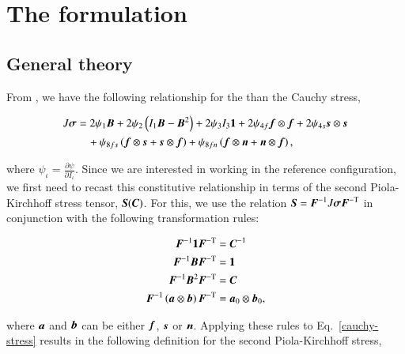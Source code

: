 \section{The formulation}
\label{formulation}

\subsection{General theory}
\label{general-theory}

From \citep{Holzapfel:2009bb}, we have the following relationship for
the than the Cauchy stress,

\begin{equation}
  \begin{split}
    J\mbox{\boldmath$\sigma$} &=   2 \psi_{1} \mbox{\boldmath$ B$}
                + 2 \psi_{2} \left(I_{1} \mbox{\boldmath$ B$} - \mbox{\boldmath$ B$}^{2}\right)
                + 2 \psi_{3} I_{3} {\bf 1}
                + 2 \psi_{4f} \mbox{\boldmath$ f$}\otimes\mbox{\boldmath$ f$}
                + 2 \psi_{4s} \mbox{\boldmath$ s$}\otimes\mbox{\boldmath$ s$}\\
        &\quad  + \psi_{8fs} \left( \mbox{\boldmath$ f$}\otimes\mbox{\boldmath$ s$} + \mbox{\boldmath$ s$}\otimes\mbox{\boldmath$ f$} \right)
                + \psi_{8fn} \left( \mbox{\boldmath$ f$}\otimes\mbox{\boldmath$ n$} + \mbox{\boldmath$ n$}\otimes\mbox{\boldmath$ f$} \right),
  \end{split}
  \label{cauchy-stress}
\end{equation}

\noindent where $\psi_{\iota} = \frac{\partial \psi}{\partial
  I_{\iota}}$. Since we are interested in working in the reference
configuration, we first need to recast this constitutive relationship
in terms of the second Piola-Kirchhoff stress tensor, $\mbox{\boldmath$ S$}(\mbox{\boldmath$ C$})$. For
this, we use the relation $\mbox{\boldmath$ S$} = \mbox{\boldmath$ F$}^{-1} J \mbox{\boldmath$\sigma$} \mbox{\boldmath$ F$}^{-\mathrm{T}}$
in conjunction with the following transformation rules:

\begin{equation*}
  \begin{split}
    \mbox{\boldmath$ F$}^{-1} {\bf 1} \mbox{\boldmath$ F$}^{-\mathrm{T}} &= \mbox{\boldmath$ C$}^{-1}\\
    \mbox{\boldmath$ F$}^{-1} \mbox{\boldmath$ B$} \mbox{\boldmath$ F$}^{-\mathrm{T}} &= {\bf 1}\\
    \mbox{\boldmath$ F$}^{-1} \mbox{\boldmath$ B$}^{2} \mbox{\boldmath$ F$}^{-\mathrm{T}} &= \mbox{\boldmath$ C$}\\
    \mbox{\boldmath$ F$}^{-1} \left(\mbox{\boldmath$ a$}\otimes\mbox{\boldmath$ b$}\right) \mbox{\boldmath$ F$}^{-\mathrm{T}} &= \mbox{\boldmath$ a$}_{0} \otimes \mbox{\boldmath$ b$}_{0},
  \end{split}
\end{equation*}

\noindent where $\mbox{\boldmath$ a$}$ and $\mbox{\boldmath$ b$}$ can be either $\mbox{\boldmath$ f$}$, $\mbox{\boldmath$ s$}$ or
$\mbox{\boldmath$ n$}$. Applying these rules to Eq.~\ref{cauchy-stress} results in the
following definition for the second Piola-Kirchhoff stress,

